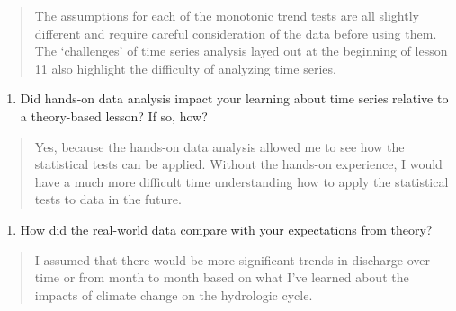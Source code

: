 \documentclass[]{article}
\providecommand{\tightlist}{%
  \setlength{\itemsep}{0pt}\setlength{\parskip}{0pt}}
\begin{document}
\begin{quote}
The assumptions for each of the monotonic trend tests are all slightly
different and require careful consideration of the data before using
them. The `challenges' of time series analysis layed out at the
beginning of lesson 11 also highlight the difficulty of analyzing time
series.
\end{quote}

\begin{enumerate}
\def\labelenumi{\arabic{enumi}.}
\setcounter{enumi}{16}
\tightlist
\item
  Did hands-on data analysis impact your learning about time series
  relative to a theory-based lesson? If so, how?
\end{enumerate}

\begin{quote}
Yes, because the hands-on data analysis allowed me to see how the
statistical tests can be applied. Without the hands-on experience, I
would have a much more difficult time understanding how to apply the
statistical tests to data in the future.
\end{quote}

\begin{enumerate}
\def\labelenumi{\arabic{enumi}.}
\setcounter{enumi}{17}
\tightlist
\item
  How did the real-world data compare with your expectations from
  theory?
\end{enumerate}

\begin{quote}
I assumed that there would be more significant trends in discharge over
time or from month to month based on what I've learned about the impacts
of climate change on the hydrologic cycle.
\end{quote}
\end{document}
